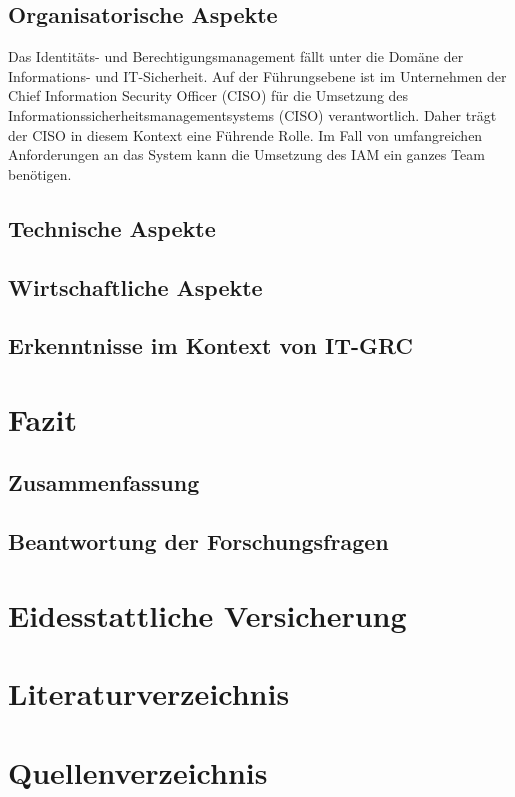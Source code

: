 \documentclass[10pt]{article}
\begin{document}
\subsection{Organisatorische Aspekte}
Das Identitäts- und Berechtigungsmanagement fällt unter die Domäne der Informations- und IT-Sicherheit. Auf der Führungsebene ist im Unternehmen der Chief Information Security Officer (CISO) für die Umsetzung des Informationssicherheitsmanagementsystems (CISO) verantwortlich. Daher trägt der CISO in diesem Kontext eine Führende Rolle. Im Fall von umfangreichen Anforderungen an das System kann die Umsetzung des IAM ein ganzes Team benötigen.
\subsection{Technische Aspekte}
\subsection{Wirtschaftliche Aspekte}
\subsection{Erkenntnisse im Kontext von IT-GRC}
\section{Fazit}
\subsection{Zusammenfassung}
\subsection{Beantwortung der Forschungsfragen}
\section{Eidesstattliche Versicherung}
\newpage
\section{Literaturverzeichnis}
\printbibliography
\newpage
\section{Quellenverzeichnis}
\end{document}
